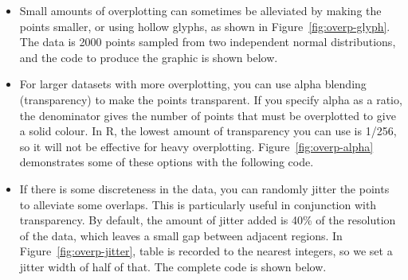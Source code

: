 \begin{itemize}

  \item Small amounts of overplotting can sometimes be alleviated by making the points smaller, or using hollow glyphs, as shown in Figure~\ref{fig:overp-glyph}. The data is 2000 points sampled from two independent normal distributions, and the code to produce the graphic is shown below.

    
  
  \item For larger datasets with more overplotting, you can use alpha blending (transparency) to make the points transparent.  If you specify alpha as a ratio, the denominator gives the number of points that must be overplotted to give a solid colour.  In R, the lowest amount of transparency you can use is 1/256, so it will not be effective for heavy overplotting.  Figure~\ref{fig:overp-alpha} demonstrates some of these options with the following code.
    
    

  \item If there is some discreteness in the data, you can randomly jitter the points to alleviate some overlaps.  This is particularly useful in conjunction with transparency.  By default, the amount of jitter added is 40\% of the resolution of the data, which leaves a small gap between adjacent regions. In Figure~\ref{fig:overp-jitter}, table is recorded to the nearest integers, so we set a jitter width of half of that.  The complete code is shown below.
  

\end{itemize}
